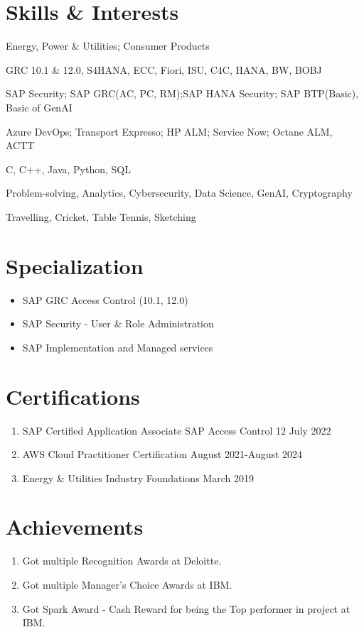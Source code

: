 \documentclass[10pt]{article}
\begin{document}
\section{Skills \& Interests}
\begin{description}[itemsep=0pt]
	\small
		\item[Industry Served:] Energy, Power \& Utilities; Consumer Products
		\item[SAP Applications:] GRC 10.1 \& 12.0, S4HANA, ECC, Fiori, ISU, C4C, HANA, BW, BOBJ
		\item[Trainings:] SAP Security; SAP GRC(AC, PC, RM);SAP HANA Security; SAP BTP(Basic), Basic of GenAI
		\item[Tools used:] Azure DevOps; Transport Expresso; HP ALM; Service Now; Octane ALM, ACTT
		\item[Language:] C, C++, Java, Python, SQL
		\item[Interests:] Problem-solving, Analytics, Cybersecurity, Data Science, GenAI, Cryptography
		\item[Hobbies:] Travelling, Cricket, Table Tennis, Sketching
\end{description}

\section{Specialization}
\begin{itemize}
	\small
		\item SAP GRC Access Control (10.1, 12.0)
		\item SAP Security - User \& Role Administration
		\item SAP Implementation and Managed services
\end{itemize}

\section{Certifications}
\begin{enumerate}[label=\null, left=0pt..0pt, itemsep=0pt]
	\small
		\item SAP Certified Application Associate SAP Access Control 12 \hfill July 2022
		\item AWS Cloud Practitioner Certification \hfill August 2021-August 2024
		\item Energy \& Utilities Industry Foundations \hfill March 2019
\end{enumerate}

\section{Achievements}
\begin{enumerate}[label=\null, left=0pt..0pt, itemsep=0pt]
	\small
		\item Got multiple Recognition Awards at Deloitte.
		\item Got multiple Manager's Choice Awards at IBM.
		\item Got Spark Award - Cash Reward for being the Top performer in project at IBM.
\end{enumerate}
\end{document}
